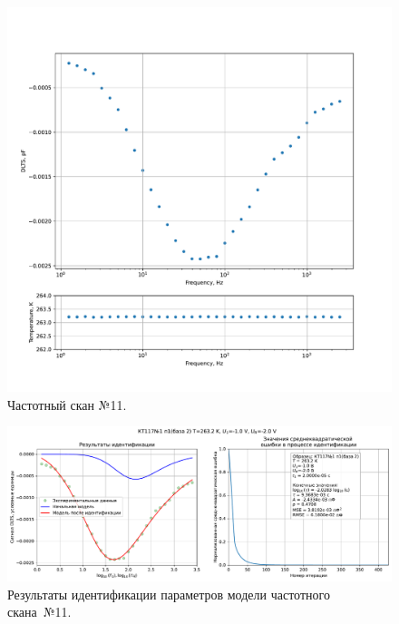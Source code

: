 \begin{figure}[!ht]
    \centering
    \includegraphics[width=1\textwidth]{../plots/КТ117№1_п1(база 2)_2500Гц-1Гц_1пФ_-10С_-1В-2В_50мВ_20мкс_шаг_0,1.pdf}
    \caption{Частотный скан №11.}
    \label{pic:frequency_scan_11}
\end{figure}

\begin{figure}[!ht]
    \centering
    \includegraphics[width=1\textwidth]{../plots/КТ117№1_п1(база 2)_2500Гц-1Гц_1пФ_-10С_-1В-2В_50мВ_20мкс_шаг_0,1_model.pdf}
    \caption{Результаты идентификации параметров модели частотного скана~№11.}
    \label{pic:frequency_scan_model11}
\end{figure}

\pagebreak


